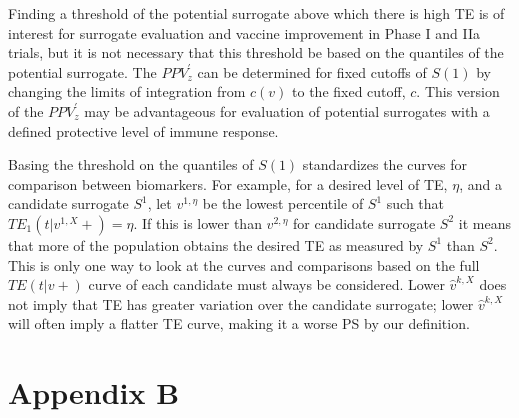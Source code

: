 \documentclass[times, 11pt]{article}
\begin{document}
Finding a threshold of the potential surrogate above which there is high TE is of interest for surrogate evaluation and vaccine improvement in Phase I and IIa trials, but it is not necessary that this threshold be based on the quantiles of the potential surrogate. The $PPV_z^{'}$ can be determined for fixed cutoffs of $S(1)$ by changing the limits of integration from $c(v)$ to the fixed cutoff, $c$. This version of the $PPV_z^{'}$ may be advantageous for evaluation of potential surrogates with a defined protective level of immune response. 

Basing the threshold on the quantiles of $S(1)$ standardizes the curves for comparison between biomarkers. For example, for a desired level of TE, $\eta$, and a candidate surrogate $S^{1}$, let $v^{1,\eta}$ be the lowest percentile of $S^{1}$ such that $TE_1(t|v^{1,X}+)=\eta$. If this is lower than $v^{2,\eta}$ for candidate surrogate $S^{2}$ it means that more of the population obtains the desired TE as measured by $S^{1}$ than $S^{2}$. This is only one way to look at the curves and comparisons based on the full $TE(t|v+)$ curve of each candidate must always be considered. Lower $\hat{v}^{k,X}$ does not imply that TE has greater variation over the candidate surrogate; lower $\hat{v}^{k,X}$ will often imply a flatter TE curve, making it a worse PS by our definition. 

\section{Appendix B}
\end{document}
